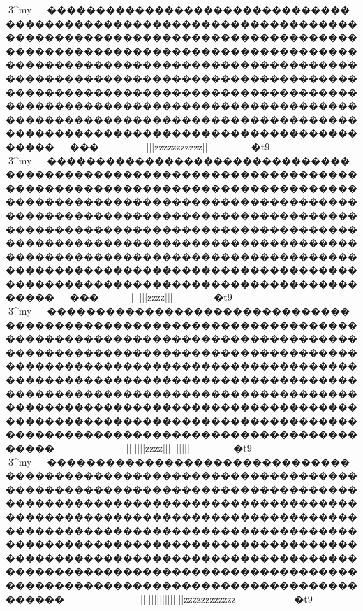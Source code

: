 {{{{{{{{{{{{{{{{{{{{{{{{{{{{{{{{{{{{{{{{{{{{{{{{{{{{{{{{{{{{{{{{{{{{{{{{{{{{{{{{{{{{{{{{{{{{{{{{{{{{{{{{{{{{{{{{{{{{{{{{{{{{{{{{{{{{{{{{{{{{{{{{{{{{{{{{{{{{{{{{{{{{{{{{{{{{{{{{{{{{{{{{{{{{{{{{{{{{{{{{{{{{{{{{{{{{{{{{{{{{{{{{{{{{{{{{{{{{{{{{{{{{{{{{{{{{{{{{{{{{{{{{{{{{{{{{{{{{{{{{{{{{{{{{{{{{{{{{{{{{{{{{{{{{{{{{{{{{{{{{{{{{{{{{{{{{{{{{{{{{{{{{{{{{{{{{{{{{{{{{{{{{{{{{{{{{{{{{{{{{{{{{{{{{{{{{{{{{{{{{{{{{{{{{{{{{{{{{{{{{{{{{{{{{{{{{{{{{{{{{{{{{{{{{{{{{{{{{{{{{{{{{{{{{{{{{{{{{{{{{{{{{{{{{{{{{{{{{{{{{{{{{{{{{{{{{{{{{{{{{{{{{{{{{{{{{{{{{{{{{{{{{{{{{{{{{{{{{{{{{{{{{{{{{{{{{{{{{{{{{{{{{{{{{{{{{{{{{{{{{{{{{{{{{{{{{{{{{{{{{{{{{{{{{{{{{{{{{{{{{{{{{{{{{{{{{{{{{{{{{{{{{{{{{{{{{{{{{{{{{{{{{3^my{}~~������������������������������������������������������������������������������������������������������������������������������������������������������������������������������������������������������������������������������������������������������������������������������������������������������������������������������������������������������������������������~~���~~~~}}}}}}}~~~~}|{{{{{{{{{{{{{{{||||{{{{zzzz{{{{{{{{{{{{{zzzzzzz{{{{|||}}}~~~~~}}}�t9

3^my{}~~������������������������������������������������������������������������������������������������������������������������������������������������������������������������������������������������������������������������������������������������������������������������������������������������������������������������������������������������������������������������~~���~~~~}}}}}}}~~}}||{{{{{{{{{{{{{{{||||{{{{zzzz{{{{{{{{{{{{{{{{{{{{{{{{|||}}}~~~~~}}}�t9

3^my{}~~������������������������������������������������������������������������������������������������������������������������������������������������������������������������������������������������������������������������������������������������������������������������������������������������������������������������������������������������������������������������~~~~}~~~~}}}}~~~~~}}|||{{{{{{{{{{{{{{||||{{{{zzzz{{{{{{{{{{{{||||||||{{{{|||}}}~~~~~}}}�t9

3^my{}~~�������������������������������������������������������������������������������������������������������������������������������������������������������������������������������������������������������������������������������������������������������������������������������������������������������������������������������������������������������������������������~~~}~~~~~~~~~~~~}}}}}}||||||||||||||||{{{{zzzzzzzzzzzz{{{{{{{{{{{{{{{{{{{{{|}~~~~~~~~}}}�t9

}}}}}}}}}}}}}}}}}}}}}}}}}}}}}}}}}}}}}}}}}}}}}}}}}}}}}}}}}}}}}}}}}}}}}}}}}}}}}}}}}}}}}}}}}}}}}}}}}}}}}}}}}}}}}}}}}}}}}}}}}}}}}}}}}}}}}}}}}}}}}}}}}}}}}}}}}}}}}}}}}}}}}}}}}}}}}}}}}}}}}}}}}}}}}}}}}}}}}}}}}}}}}}}}}}}}}}}}}}}}}}}}}}}}}}}}}}}}}}}}}}}}}}}}}}}}}}}}}}}}}}}}}}}}}}}}}}}}}}}}}}}}}}}}}}}}}}}}}}}}}}}}}}}}}}}}}}}}}}}}}}}}}}}}}}}}}}}}}}}}}}}}}}}}}}}}}}}}}}}}}}}}}}}}}}}}}}}}}}}}}}}}}}}}}}}}}}}}}}}}}}}}}}}}}}}}}}}}}}}}}}}}}}}}}}}}}}}}}}}}}}}}}}}}}}}}}}}}}}}}}}}}}}}}}}}}}}}}}}}}}}}}}}}}}}}}}}}}}}}}}}}}}}}}}}}}}}}}}}}}}}}}}}}}}}}}}}}}}}}}}}}}}}}}}}}}}}}}}}}}}}}}}}}}}}}}}}}}}}}}}}}}}}}}}}}}}}}}}}}}}}}}}}}}}}}}}}}}}}}}}}}}}}}}}}}}}}}}}}}}}}}}}}}}}}}}}}}}}}}}}}}}}}}}}}}}}}}}}}}}}}}}}}}}}}}}}}}}}}}}}}}}}}}}}}}}}}}}}}}}}}}}}}}}}}}}}}}}}}}}}}}}}}}}}}}}}}}}}}}}}}}}}}}}}
